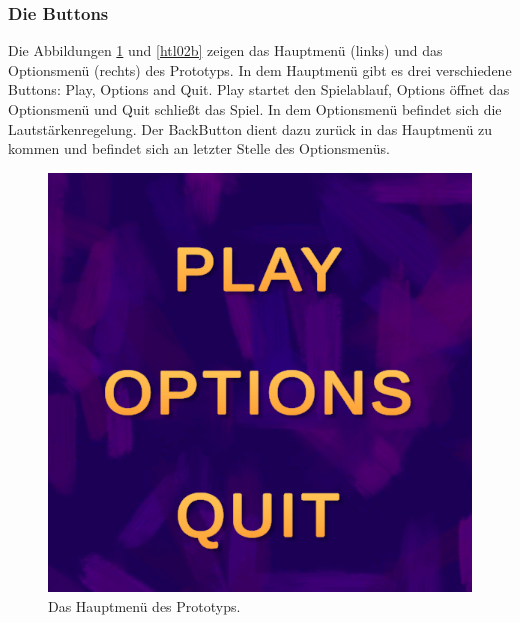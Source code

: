 \subsubsection{Die Buttons}
Die Abbildungen \ref{htl02a} und \ref{htl02b} zeigen das Hauptmenü (links) und das Optionsmenü (rechts) des Prototyps. In dem Hauptmenü gibt es drei verschiedene Buttons: Play, Options and Quit. Play startet den Spielablauf, Options öffnet das Optionsmenü und Quit schließt das Spiel. In dem Optionsmenü befindet sich die Lautstärkenregelung. Der \glqq Back\grqq \space Button dient dazu zurück in das Hauptmenü zu kommen und befindet sich an letzter Stelle des Optionsmenüs.

\begin{figure}[H]
    \centering
    \begin{minipage}{0.35\textwidth}
        \centering
        \includegraphics[width=\linewidth]{chapters/03/images/MainMenu.png}
        \caption{Das Hauptmenü des Prototyps.}
        \label{htl02a}
    \end{minipage}%
    \hspace{1cm}%
    \begin{minipage}{0.35\textwidth}
        \centering

\end{minipage}
\end{figure}
